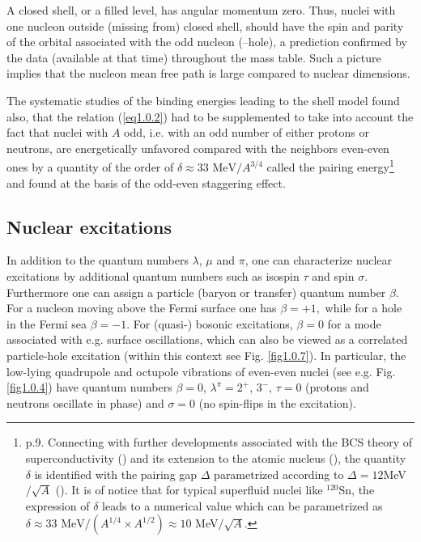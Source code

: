 A closed shell, or a filled level, has angular momentum zero. Thus, nuclei with one nucleon outside (missing from) closed shell, should have the spin and parity of the orbital associated with the odd nucleon (--hole), a prediction confirmed by the data (available at that time) throughout the mass table. Such a picture implies that the nucleon mean free path is large compared to nuclear dimensions.


The systematic studies of the binding energies leading to the shell model found also, that the relation (\ref{eq1.0.2}) had to be supplemented to take into account the fact that nuclei with $A$ odd,  i.e. with an odd number of either protons or neutrons, are energetically unfavored compared with the neighbors even-even ones by a quantity of the order of $\delta\approx33\text{ MeV}/A^{3/4}$ called the pairing energy\footnote{\label{foot2} \cite{Mayer:55} p.9. Connecting with further developments associated with the BCS theory of superconductivity (\cite{Bardeen:57a,Bardeen:57b}) and its extension to the atomic nucleus (\cite{Bohr:58}), the quantity $\delta$ is identified with the pairing gap $\Delta$ parametrized according to $\Delta=12 $MeV$/\sqrt{A}$ (\cite{Bohr:69}). It is of notice that for typical superfluid nuclei like $^{120}$Sn, the expression of $\delta$ leads to a numerical value which can be parametrized as  $\delta\approx33\text{ MeV}/(A^{1/4}\times A^{1/2})\approx10$ MeV$/\sqrt{A}$.} and found at the basis of the odd-even staggering effect.

\subsection{Nuclear excitations}\label{S1.1.2}
In addition to the quantum numbers $\lambda$,  $\mu$ and $\pi$, one can characterize nuclear excitations by additional quantum numbers such as isospin $\tau$ and spin $\sigma$. Furthermore one can assign a particle (baryon or transfer) quantum number $\beta$. For a nucleon moving above the Fermi surface one has $\beta=+1,$ while for a hole in the Fermi sea $\beta=-1$. For (quasi-) bosonic excitations, $\beta=0$ for a mode associated with e.g. surface oscillations, which can also be viewed as a correlated particle-hole excitation (within this context see Fig. \ref{fig1.0.7}). In particular, the low-lying quadrupole and octupole vibrations of even-even nuclei (see e.g. Fig. \ref{fig1.0.4}) have quantum numbers $\beta=0$, $\lambda^\pi=2^+$, $3^-$, $\tau=0$ (protons and neutrons oscillate in phase) and $\sigma=0$ (no spin-flips in the excitation).

